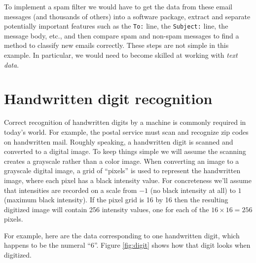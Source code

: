\documentclass[
]{krantz}
\begin{document}
To implement a spam filter we would have to get the data from these email messages (and thousands of others) into a software package, extract and separate potentially important features such as the \texttt{To:} line, the \texttt{Subject:} line, the message body, etc., and then compare spam and non-spam messages to find a method to classify new emails correctly. These steps are not simple in this example. In particular, we would need to become skilled at working with \emph{text data}.

\hypertarget{handwritten-digit-recognition}{%
\section{Handwritten digit recognition}\label{handwritten-digit-recognition}}

Correct recognition of handwritten digits by a machine is commonly required in today's world. For example, the postal service must scan and recognize zip codes on handwritten mail. Roughly speaking, a handwritten digit is scanned and converted to a digital image. To keep things simple we will assume the scanning creates a grayscale rather than a color image. When converting an image to a grayscale digital image, a grid of ``pixels'' is used to represent the handwritten image, where each pixel has a black intensity value. For concreteness we'll assume that intensities are recorded on a scale from \(-1\) (no black intensity at all) to \(1\) (maximum black intensity). If the pixel grid is 16 by 16 then the resulting digitized image will contain 256 intensity values, one for each of the \(16\times 16 = 256\) pixels.

For example, here are the data corresponding to one handwritten digit, which happens to be the numeral ``6''. Figure \ref{fig:digit} shows how that digit looks when digitized.
\end{document}
